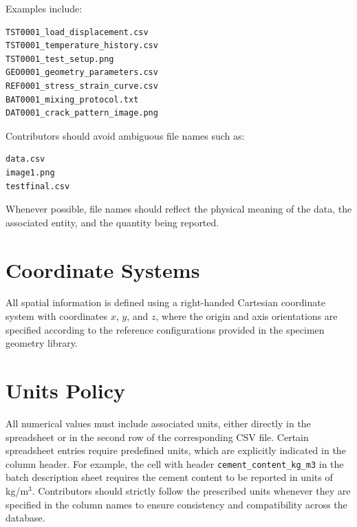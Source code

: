 \documentclass[11pt]{book}
\begin{document}
\vspace{5mm}
Examples include:

\begin{verbatim}
TST0001_load_displacement.csv
TST0001_temperature_history.csv
TST0001_test_setup.png
GEO0001_geometry_parameters.csv
REF0001_stress_strain_curve.csv
BAT0001_mixing_protocol.txt
DAT0001_crack_pattern_image.png
\end{verbatim}

Contributors should avoid ambiguous file names such as:

\begin{verbatim}
data.csv
image1.png
testfinal.csv
\end{verbatim}

Whenever possible, file names should reflect the physical meaning of the data, the associated entity, and the quantity being reported.
\section{Coordinate Systems}
All spatial information is defined using a right-handed Cartesian coordinate system with coordinates $x$, $y$, and $z$, where the origin and axis orientations are specified according to the reference configurations provided in the specimen geometry library. 

\section{Units Policy}
All numerical values must include associated units, either directly in the spreadsheet or in the second row of the corresponding CSV file. Certain spreadsheet entries require predefined units, which are explicitly indicated in the column header. For example, the cell with header \texttt{cement\_content\_kg\_m3} in the batch description sheet requires the cement content to be reported in units of kg/m$^3$. Contributors should strictly follow the prescribed units whenever they are specified in the column names to ensure consistency and compatibility across the database.
\end{document}

